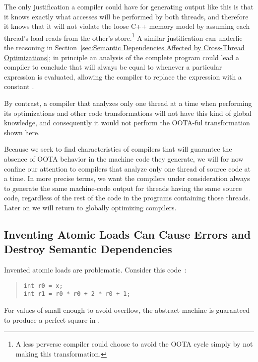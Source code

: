 The only justification a compiler could have for generating output like
this is that it knows exactly what accesses will be performed by both
threads, and therefore it knows that it will not violate the loose C++
memory model by assuming each thread's load reads from the other's
store.\footnote{
	A less perverse compiler could choose to avoid the
	OOTA cycle simply by not making this transformation.}
A similar justification can underlie the reasoning in
Section~\ref{sec:Semantic Dependencies Affected by Cross-Thread Optimizations};
in principle an analysis of the complete program could lead a compiler
to conclude that  will always be equal to  whenever a
particular  expression is evaluated, allowing the compiler
to replace the expression with a constant .

By contrast, a compiler that analyzes only one thread at a time when
performing its optimizations and other code transformations will not
have this kind of global knowledge, and consequently it would not
perform the OOTA-ful transformation shown here.

Because we seek to find characteristics of compilers that will
guarantee the absence of OOTA behavior in the machine code they generate,
we will for now confine our attention to compilers that analyze only
one thread of source code at a time.
In more precise terms, we want the compilers under consideration
always to generate the same machine-code output for threads having
the same source code, regardless of the rest of the code in the programs
containing those threads.
Later on we will return to globally optimizing compilers.

\subsection{Inventing Atomic Loads Can Cause Errors and
Destroy Semantic Dependencies}
\label{sec:Inventing Atomic Loads Can Cause Errors and
Destroy Semantic Dependencies}

Invented atomic loads are problematic.
Consider this code~\cite{PaulEMcKenney2023P3046R2/OOTAwithoutTrying}:
\begin{quote}
\begin{verbatim}
int r0 = x;
int r1 = r0 * r0 + 2 * r0 + 1;
\end{verbatim}
\end{quote}
For values of  small enough to avoid overflow, the abstract machine is
guaranteed to produce a perfect square in .

